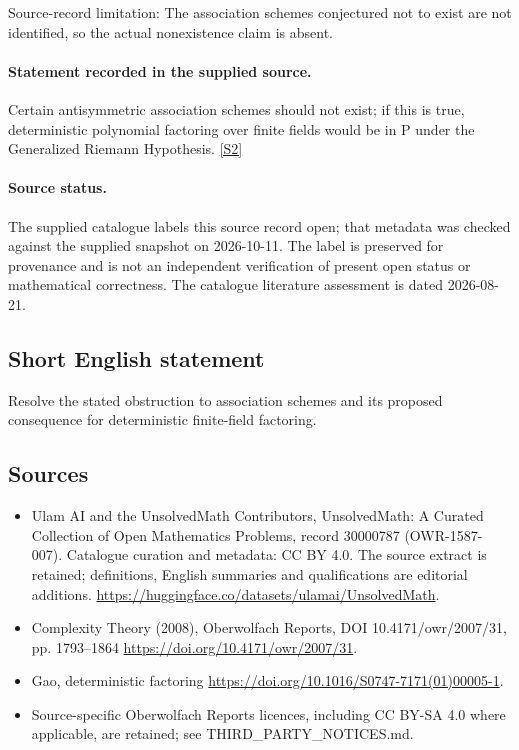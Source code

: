 \documentclass[11pt]{article}
\begin{document}
Source-record limitation: The association schemes conjectured not to exist are not identified, so the actual nonexistence claim is absent.
\paragraph{Statement recorded in the supplied source.}
Certain antisymmetric association schemes should not exist; if this is true, deterministic polynomial factoring over finite fields would be in $\mathrm{P}$ under the Generalized Riemann Hypothesis. \href{https://doi.org/10.4171/owr/2007/31}{[S2]}
\paragraph{Source status.}
The supplied catalogue labels this source record open; that metadata was checked against the supplied snapshot on 2026-10-11. The label is preserved for provenance and is not an independent verification of present open status or mathematical correctness. The catalogue literature assessment is dated 2026-08-21.
\subsection{Short English statement}
Resolve the stated obstruction to association schemes and its proposed consequence for deterministic finite-field factoring.
\subsection{Sources}
\begin{itemize}
\item[S1] Ulam AI and the UnsolvedMath Contributors, UnsolvedMath: A Curated Collection of Open Mathematics Problems, record 30000787 (OWR-1587-007). Catalogue curation and metadata: CC BY 4.0. The source extract is retained; definitions, English summaries and qualifications are editorial additions.
\url{https://huggingface.co/datasets/ulamai/UnsolvedMath}.
\item[S2] Complexity Theory (2008), Oberwolfach Reports, DOI 10.4171/owr/2007/31, pp. 1793--1864
\url{https://doi.org/10.4171/owr/2007/31}.
\item[S3] Gao, deterministic factoring
\url{https://doi.org/10.1016/S0747-7171(01)00005-1}.
\item Source-specific Oberwolfach Reports licences, including CC BY-SA 4.0 where applicable, are retained; see THIRD\_PARTY\_NOTICES.md.
\end{itemize}
\end{document}
